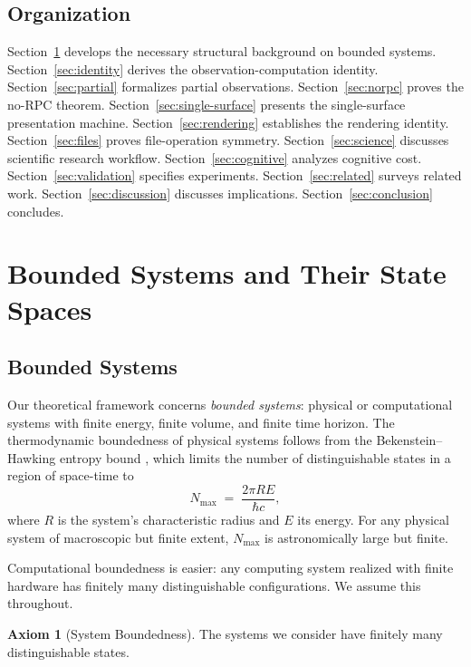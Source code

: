 \documentclass[11pt,twocolumn,a4paper]{article}
\theoremstyle{definition}
\newtheorem{axiom}[theorem]{Axiom}
\theoremstyle{remark}
\begin{document}
\subsection{Organization}

Section~\ref{sec:bounded} develops the necessary structural background on bounded systems.
Section~\ref{sec:identity} derives the observation-computation identity.
Section~\ref{sec:partial} formalizes partial observations.
Section~\ref{sec:norpc} proves the no-RPC theorem.
Section~\ref{sec:single-surface} presents the single-surface presentation machine.
Section~\ref{sec:rendering} establishes the rendering identity.
Section~\ref{sec:files} proves file-operation symmetry.
Section~\ref{sec:science} discusses scientific research workflow.
Section~\ref{sec:cognitive} analyzes cognitive cost.
Section~\ref{sec:validation} specifies experiments.
Section~\ref{sec:related} surveys related work.
Section~\ref{sec:discussion} discusses implications.
Section~\ref{sec:conclusion} concludes.

\section{Bounded Systems and Their State Spaces}
\label{sec:bounded}

\subsection{Bounded Systems}

Our theoretical framework concerns \emph{bounded systems}: physical or computational systems with finite energy, finite volume, and finite time horizon. The thermodynamic boundedness of physical systems follows from the Bekenstein--Hawking entropy bound \citep{bekenstein1973black, hawking1975particle}, which limits the number of distinguishable states in a region of space-time to
\begin{equation}
\label{eq:bekenstein}
N_{\max} \;=\; \frac{2 \pi R E}{\hbar c},
\end{equation}
where $R$ is the system's characteristic radius and $E$ its energy. For any physical system of macroscopic but finite extent, $N_{\max}$ is astronomically large but finite.

Computational boundedness is easier: any computing system realized with finite hardware has finitely many distinguishable configurations. We assume this throughout.

\begin{axiom}[System Boundedness]
\label{ax:bounded}
The systems we consider have finitely many distinguishable states.
\end{axiom}
\end{document}
